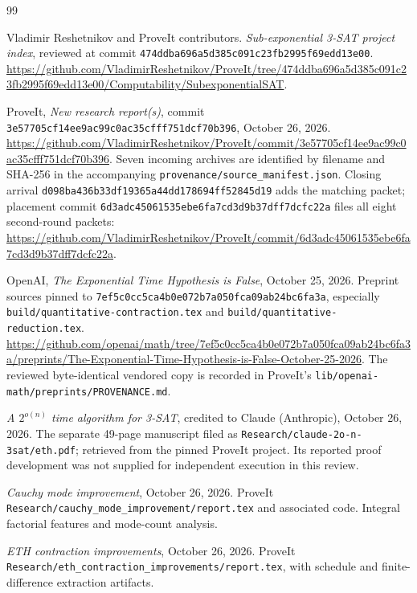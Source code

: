 \begin{thebibliography}{99}
\raggedright
{} Vladimir Reshetnikov and ProveIt contributors.
\emph{Sub-exponential 3-SAT project index}, reviewed at commit
\nolinkurl{474ddba696a5d385c091c23fb2995f69edd13e00}.
\url{https://github.com/VladimirReshetnikov/ProveIt/tree/474ddba696a5d385c091c23fb2995f69edd13e00/Computability/SubexponentialSAT}.

 ProveIt, \emph{New research report(s)}, commit
\nolinkurl{3e57705cf14ee9ac99c0ac35cfff751dcf70b396}, October 26, 2026.
\url{https://github.com/VladimirReshetnikov/ProveIt/commit/3e57705cf14ee9ac99c0ac35cfff751dcf70b396}.
Seven incoming archives are identified by filename and SHA-256 in the
accompanying \nolinkurl{provenance/source_manifest.json}. Closing arrival
\nolinkurl{d098ba436b33df19365a44dd178694ff52845d19} adds the matching packet;
placement commit \nolinkurl{6d3adc45061535ebe6fa7cd3d9b37dff7dcfc22a}
files all eight second-round packets:
\url{https://github.com/VladimirReshetnikov/ProveIt/commit/6d3adc45061535ebe6fa7cd3d9b37dff7dcfc22a}.

 OpenAI, \emph{The Exponential Time Hypothesis is False},
October 25, 2026. Preprint sources pinned to
\nolinkurl{7ef5c0cc5ca4b0e072b7a050fca09ab24bc6fa3a}, especially
\nolinkurl{build/quantitative-contraction.tex} and
\nolinkurl{build/quantitative-reduction.tex}.
\url{https://github.com/openai/math/tree/7ef5c0cc5ca4b0e072b7a050fca09ab24bc6fa3a/preprints/The-Exponential-Time-Hypothesis-is-False-October-25-2026}.
The reviewed byte-identical vendored copy is recorded in ProveIt's
\nolinkurl{lib/openai-math/preprints/PROVENANCE.md}.

 \emph{A $2^{o(n)}$ time algorithm for 3-SAT}, credited
to Claude (Anthropic), October 26, 2026. The separate 49-page manuscript
filed as \nolinkurl{Research/claude-2o-n-3sat/eth.pdf}; retrieved from the
pinned ProveIt project. Its reported proof development was not supplied
for independent execution in this review.

 \emph{Cauchy mode improvement}, October 26, 2026.
ProveIt \nolinkurl{Research/cauchy_mode_improvement/report.tex} and
associated code. Integral factorial features and mode-count analysis.

 \emph{ETH contraction improvements}, October 26,
2026. ProveIt \nolinkurl{Research/eth_contraction_improvements/report.tex},
with schedule and finite-difference extraction artifacts.


\end{thebibliography}
